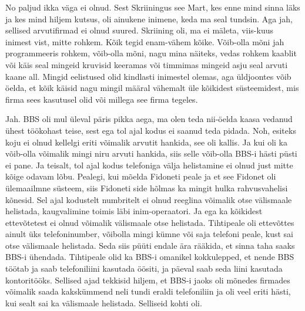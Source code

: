 
No paljud ikka väga ei olnud. Sest Skriiningus see Mart, kes enne mind sinna 
läks ja kes mind hiljem kutsus, oli ainukene inimene, keda ma seal tundsin. Aga 
jah, sellised arvutifirmad ei olnud suured. Skriining oli, ma ei mäleta, viis-kuus 
inimest vist, mitte rohkem. Kõik tegid  enam-vähem kõike. Võib-olla 
mõni jah programmeeris rohkem, võib-olla mõni, nagu mina näiteks, vedas rohkem 
kaablit või käis seal mingeid kruvisid keeramas või timmimas mingeid asju seal 
arvuti kaane all. Mingid eelistused olid kindlasti inimestel olemas, aga 
üldjoontes võib öelda, et kõik käisid nagu mingil määral vähemalt üle kõikidest 
 süsteemidest, mis firma  sees kasutusel olid või millega see firma tegeles.


Jah. BBS  oli mul üleval päris pikka aega, ma olen teda nii-öelda kaasa vedanud 
 ühest töökohast teise, sest ega tol ajal kodus ei saanud teda pidada. Noh, 
esiteks koju ei olnud kellelgi eriti võimalik arvutit hankida, see oli kallis. 
Ja kui oli ka võib-olla võimalik mingi niru arvuti hankida, siis selle  
võib-olla BBS-i hästi püsti ei pane. Ja teisalt, tol ajal kodus telefoniga 
välja helistamine ei olnud just mitte kõige odavam lõbu. Pealegi, kui mõelda 
Fidoneti peale ja et see Fidonet  oli ülemaailmne süsteem, siis Fidoneti side 
hõlmas ka mingit hulka rahvusvahelisi kõnesid. Sel ajal kodustelt numbritelt ei 
olnud reeglina võimalik otse  välismaale helistada, kaugvalimine toimis läbi 
inim-operaatori. Ja ega ka kõikidest ettevõtetest  ei olnud võimalik välismaale 
otse helistada. Tihtipeale oli ettevõttes ainult üks telefoninumber, võibolla mingi kümne 
või saja telefoni peale, kust sai otse välismaale helistada. Seda siis püüti 
endale ära rääkida, et sinna taha saaks BBS-i ühendada. Tihtipeale olid ka 
BBS-i omanikel kokkulepped, et nende BBS töötab ja saab telefoniliini kasutada 
öösiti, ja päeval saab seda liini kasutada kontoritööks. 
Sellised ajad tekkisid hiljem, et BBS-i jaoks oli mõnedes firmades võimalik 
saada kakskümmend neli tundi eraldi telefoniliin ja oli veel eriti hästi, kui sealt sai ka 
välismaale helistada. Selliseid kohti oli. 

